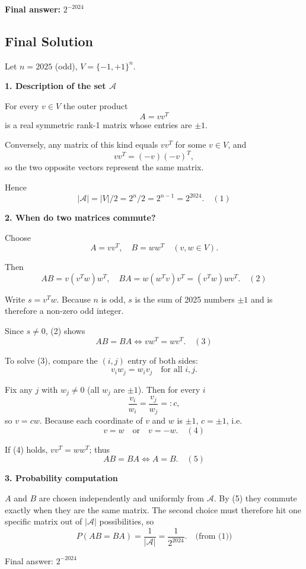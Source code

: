 \documentclass[12pt,a4paper]{article}
\theoremstyle{definition}
\begin{document}
    \textbf{Final answer:} $2^{-2024}$

    \subsection{Final Solution}
    Let $n = 2025$ (odd), $V = \{-1,+1\}^n$.

    \textbf{1. Description of the set $\mathcal{A}$}

    For every $v \in V$ the outer product
    $$A = vv^T$$
    is a real symmetric rank-1 matrix whose entries are $\pm 1$.

    Conversely, any matrix of this kind equals $vv^T$ for some $v \in V$, and
    $$vv^T = (-v)(-v)^T,$$
    so the two opposite vectors represent the same matrix.

    Hence
    $$|\mathcal{A}| = |V| / 2 = 2^n/2 = 2^{n-1} = 2^{2024}. \quad (1)$$

    \textbf{2. When do two matrices commute?}

    Choose
    $$A = vv^T, \quad B = ww^T \quad (v,w \in V).$$

    Then
    $$AB = v(v^Tw)w^T, \quad BA = w(w^Tv)v^T = (v^Tw)wv^T. \quad (2)$$

    Write $s = v^Tw$. Because $n$ is odd, $s$ is the sum of 2025 numbers $\pm 1$ and is therefore a non-zero odd integer.

    Since $s \neq 0$, (2) shows
    $$AB = BA \Leftrightarrow vw^T = wv^T. \quad (3)$$

    To solve (3), compare the $(i,j)$ entry of both sides:
    $$v_i w_j = w_i v_j \quad \text{for all } i,j.$$

    Fix any $j$ with $w_j \neq 0$ (all $w_j$ are $\pm 1$). Then for every $i$
    $$\frac{v_i}{w_i} = \frac{v_j}{w_j} =: c,$$
    so $v = cw$. Because each coordinate of $v$ and $w$ is $\pm 1$, $c = \pm 1$, i.e.
    $$v = w \quad \text{or} \quad v = -w. \quad (4)$$

    If (4) holds, $vv^T = ww^T$; thus
    $$AB = BA \Leftrightarrow A = B. \quad (5)$$

    \textbf{3. Probability computation}

    $A$ and $B$ are chosen independently and uniformly from $\mathcal{A}$. By (5) they commute exactly when they are the same matrix. The second choice must therefore hit one specific matrix out of $|\mathcal{A}|$ possibilities, so
    $$P(AB = BA) = \frac{1}{|\mathcal{A}|} = \frac{1}{2^{2024}}. \quad \text{(from (1))}$$

    Final answer: $2^{-2024}$
\end{document}
